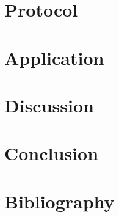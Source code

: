 \documentclass[a4paper]{report}
\theoremstyle{plain}
\begin{document}
 \clearpage
\chapter{Protocol}
    

\clearpage
\chapter{Application}
    
    
    
    
    
    
\clearpage    
\chapter{Discussion}

\clearpage
\chapter{Conclusion}

\clearpage
\chapter{Bibliography}


\end{document}
